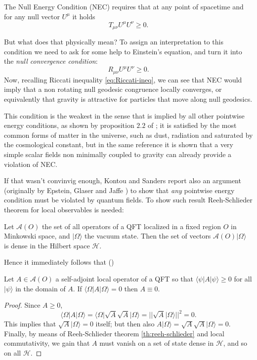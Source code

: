 \begin{definition}
    \label{def:NEC}
    The Null Energy Condition (NEC) requires that at any point of spacetime and for any null vector \(U^{\mu}\) it holds
    \[
    T_{\mu\nu}U^{\mu}U^{\nu} \ge 0.
    \]
\end{definition}

But what does that physically mean? To assign an interpretation to this condition we need to ask for some help to Einstein's equation, and turn it into the \emph{null convergence condition}:
\[
    R_{\mu\nu}U^{\mu}U^{\nu} \ge 0. 
\]
Now, recalling Riccati inequality \eqref{eq:Riccati-ineq}, we can see that NEC would imply that a non rotating null geodesic congruence locally converges, or equivalently that gravity is attractive for particles that move along null geodesics.

This condition is the weakest in the sense that is implied by all other pointwise energy conditions, as shown by proposition \(2.2\) of \cite{kontou2020energy}; it is satisfied by the most common forms of matter in the universe, such as dust, radiation and saturated by the cosmological constant, but in the same reference \cite{kontou2020energy} it is shown that a very simple scalar fields non minimally coupled to gravity can already provide a violation of NEC.

If that wasn't convinvig enough, Kontou and Sanders report also an argument (originally by Epstein, Glaser and Jaffe \cite{epstein1965nonpositivity}) to show that \emph{any} pointwise energy condition must be violated by quantum fields. To show such result Reeh-Schlieder theorem for local observables is needed:
\begin{theorem}
    \label{th:reeh-schlieder}
    Let \(\mathcal{A}(O)\) the set of all operators of a QFT localized in a fixed region \(O\) in Minkowski space, and \(\vert \Omega \rangle\) the vacuum state. Then the set of vectors \(\mathcal{A}(O)\vert \Omega \rangle\) is dense in the Hilbert space \(\mathcal{H}\).
\end{theorem}

Hence it immediately follows that (\cite{epstein1965nonpositivity})
\begin{theorem}
    \label{th:quantum-violation-pointwise-conditions}
    Let \(A\in \mathcal{A}(O)\) a self-adjoint local operator of a QFT so that \(\langle \psi\vert A\vert\psi\rangle\ge 0\) for all \(\vert\psi\rangle\) in the domain of \(A\). If \(\langle \Omega\vert A\vert\Omega\rangle = 0\) then \(A \equiv 0\).
\end{theorem}
\begin{proof}
    Since \(A\ge 0\), 
    \[
        \langle \Omega\vert A\vert\Omega\rangle = \langle \Omega\vert \sqrt{A}\sqrt{A}\vert\Omega\rangle = \vert\vert \sqrt{A}\vert\Omega\rangle\vert\vert^2 = 0.
    \] 
    This implies that \(\sqrt{A}\vert\Omega\rangle = 0\) itself; but then also \(A\vert\Omega\rangle = \sqrt{A}\sqrt{A}\vert\Omega\rangle = 0\). Finally, by means of Reeh-Schlieder theorem \ref{th:reeh-schlieder} and local commutativity, we gain that \(A\) must vanish on a set of state dense in \(\mathcal{H}\), and so on all \(\mathcal{H}\).
\end{proof}


